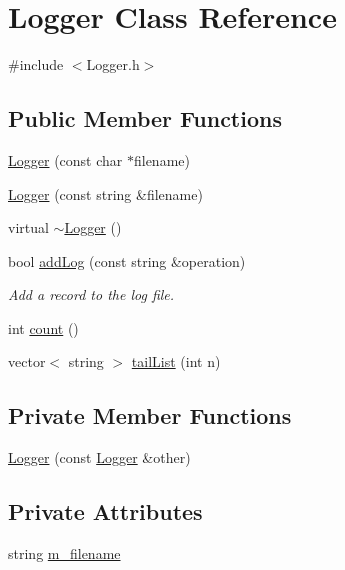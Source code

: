 \hypertarget{classLogger}{\section{\-Logger \-Class \-Reference}
\label{db/d67/classLogger}
}


{\ttfamily \#include $<$\-Logger.\-h$>$}

\subsection*{\-Public \-Member \-Functions}
\begin{DoxyCompactItemize}
\item 
\hyperlink{classLogger_a0916670d60807c695fc70d9734a93815}{\-Logger} (const char $\ast$filename)
\item 
\hyperlink{classLogger_a0ee14f33b07361f8f78b85b026fb0adc}{\-Logger} (const string \&filename)
\item 
virtual \hyperlink{classLogger_acb668a9e186a25fbaad2e4af6d1ed00a}{$\sim$\-Logger} ()
\item 
bool \hyperlink{classLogger_a9f927f569b189fd59ba66a12a8612e6d}{add\-Log} (const string \&operation)
\begin{DoxyCompactList}\small\item\em \-Add a record to the log file. \end{DoxyCompactList}\item 
int \hyperlink{classLogger_ae73ef1b58c2fc74e19e66660530a62ef}{count} ()
\item 
vector$<$ string $>$ \hyperlink{classLogger_aa1defe30f8805250673f32c7845c2146}{tail\-List} (int n)
\end{DoxyCompactItemize}
\subsection*{\-Private \-Member \-Functions}
\begin{DoxyCompactItemize}
\item 
\hyperlink{classLogger_a25dabaa7b9631ab7e7988b6b610c6f3a}{\-Logger} (const \hyperlink{classLogger}{\-Logger} \&other)
\end{DoxyCompactItemize}
\subsection*{\-Private \-Attributes}
\begin{DoxyCompactItemize}
\item 
string \hyperlink{classLogger_aeb98df86650487b330427a1e48ec31d3}{m\-\_\-filename}
\end{DoxyCompactItemize}


